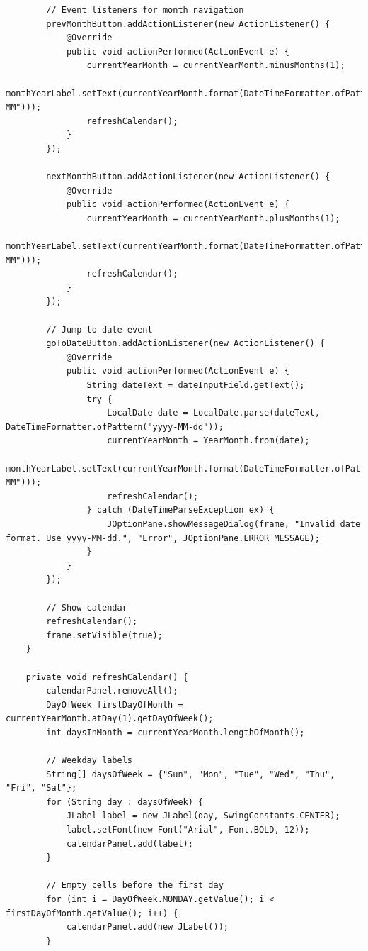 \documentclass[12pt,a4paper]{article}
\begin{document}
\begin{lstlisting}
        // Event listeners for month navigation
        prevMonthButton.addActionListener(new ActionListener() {
            @Override
            public void actionPerformed(ActionEvent e) {
                currentYearMonth = currentYearMonth.minusMonths(1);
                monthYearLabel.setText(currentYearMonth.format(DateTimeFormatter.ofPattern("yyyy-MM")));
                refreshCalendar();
            }
        });

        nextMonthButton.addActionListener(new ActionListener() {
            @Override
            public void actionPerformed(ActionEvent e) {
                currentYearMonth = currentYearMonth.plusMonths(1);
                monthYearLabel.setText(currentYearMonth.format(DateTimeFormatter.ofPattern("yyyy-MM")));
                refreshCalendar();
            }
        });

        // Jump to date event
        goToDateButton.addActionListener(new ActionListener() {
            @Override
            public void actionPerformed(ActionEvent e) {
                String dateText = dateInputField.getText();
                try {
                    LocalDate date = LocalDate.parse(dateText, DateTimeFormatter.ofPattern("yyyy-MM-dd"));
                    currentYearMonth = YearMonth.from(date);
                    monthYearLabel.setText(currentYearMonth.format(DateTimeFormatter.ofPattern("yyyy-MM")));
                    refreshCalendar();
                } catch (DateTimeParseException ex) {
                    JOptionPane.showMessageDialog(frame, "Invalid date format. Use yyyy-MM-dd.", "Error", JOptionPane.ERROR_MESSAGE);
                }
            }
        });

        // Show calendar
        refreshCalendar();
        frame.setVisible(true);
    }

    private void refreshCalendar() {
        calendarPanel.removeAll();
        DayOfWeek firstDayOfMonth = currentYearMonth.atDay(1).getDayOfWeek();
        int daysInMonth = currentYearMonth.lengthOfMonth();

        // Weekday labels
        String[] daysOfWeek = {"Sun", "Mon", "Tue", "Wed", "Thu", "Fri", "Sat"};
        for (String day : daysOfWeek) {
            JLabel label = new JLabel(day, SwingConstants.CENTER);
            label.setFont(new Font("Arial", Font.BOLD, 12));
            calendarPanel.add(label);
        }

        // Empty cells before the first day
        for (int i = DayOfWeek.MONDAY.getValue(); i < firstDayOfMonth.getValue(); i++) {
            calendarPanel.add(new JLabel());
        }


\end{lstlisting}
\end{document}
